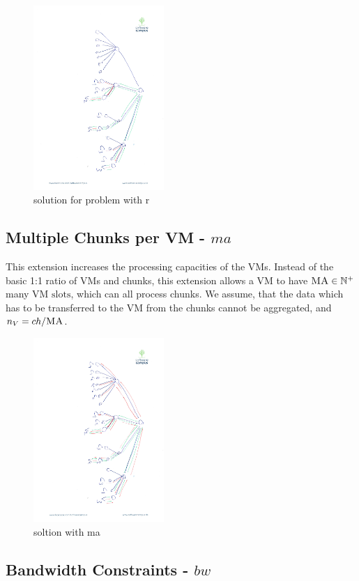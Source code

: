 \documentclass[9pt,twocolumn]{scrartcl}
\newcommand{\VmSlot}{\text{VM slot}}
\newcommand{\VmSlots}{\VmSlot\text{s}}
\newcommand{\MaFactor}{\ensuremath{\textsc{MA}}}
\newcommand{\Vms}{\ensuremath{n_V}}
\newcommand{\ChunkTypes}{\ensuremath{ch}}
\begin{document}
\begin{appendix}
\begin{figure}
\includegraphics[angle=90,origin=c, height=7cm]{figs/model_fig_skteches/r_cv}
\caption{solution for problem with r}
\end{figure}




\subsection{Multiple Chunks per VM - $ma$}

This extension increases the processing capacities of the VMs. Instead of the
basic 1:1 ratio of VMs and chunks, this extension allows a VM to have $\MaFactor
\in \mathbb{N}^+$ many $\VmSlots$, which can all process chunks. We assume,
that the data which has to
be transferred to the VM from the chunks cannot be aggregated, and $\Vms =
\ChunkTypes / \MaFactor$.

\begin{figure}

\includegraphics[angle=90,origin=c, height=7cm]{figs/model_fig_skteches/ma_r_cv}
\caption{soltion with ma}
\end{figure}

\subsection{Bandwidth Constraints - $bw$}


\end{appendix}
\end{document}
